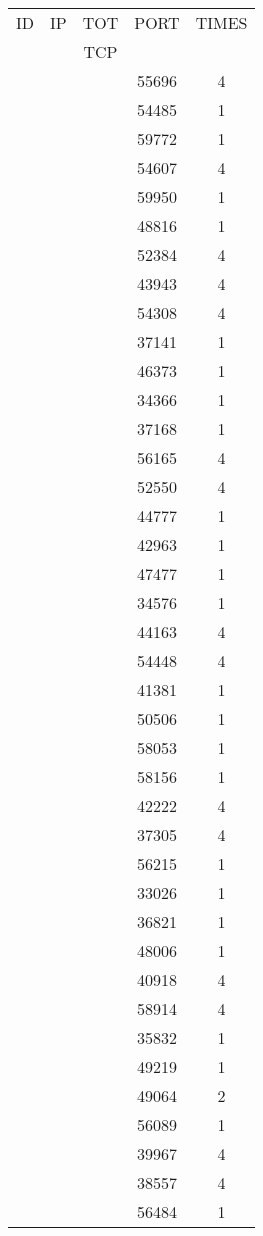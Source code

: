 \documentclass[a4paper]{scrartcl}
\begin{document}
\begin{minipage}[b]{0.5\linewidth}
\begin{tabular}{| c | c | c | c | c |}
\hline
ID & IP & TOT & PORT & TIMES \\ 
   &    & TCP &      &       \\ 
\hline
& & & 55696 & 4 \\ & & & 54485 & 1 \\ & & & 59772 & 1 \\ & & & 54607 & 4 \\ & & & 59950 & 1 \\ & & & 48816 & 1 \\ & & & 52384 & 4 \\ & & & 43943 & 4 \\ & & & 54308 & 4 \\ & & & 37141 & 1 \\ & & & 46373 & 1 \\ & & & 34366 & 1 \\ & & & 37168 & 1 \\ & & & 56165 & 4 \\ & & & 52550 & 4 \\ & & & 44777 & 1 \\ & & & 42963 & 1 \\ & & & 47477 & 1 \\ & & & 34576 & 1 \\ & & & 44163 & 4 \\ & & & 54448 & 4 \\ & & & 41381 & 1 \\ & & & 50506 & 1 \\ & & & 58053 & 1 \\ & & & 58156 & 1 \\ & & & 42222 & 4 \\ & & & 37305 & 4 \\ & & & 56215 & 1 \\ & & & 33026 & 1 \\ & & & 36821 & 1 \\ & & & 48006 & 1 \\ & & & 40918 & 4 \\ & & & 58914 & 4 \\ & & & 35832 & 1 \\ & & & 49219 & 1 \\ & & & 49064 & 2 \\ & & & 56089 & 1 \\ & & & 39967 & 4 \\ & & & 38557 & 4 \\ & & & 56484 & 1 \\ \hline\end{tabular}\end{minipage} \hfill\begin{minipage}[b]{0.5\linewidth}\begin{tabular}{| c | c | c | c | c |}

\end{tabular}
\end{minipage}
\end{document}
